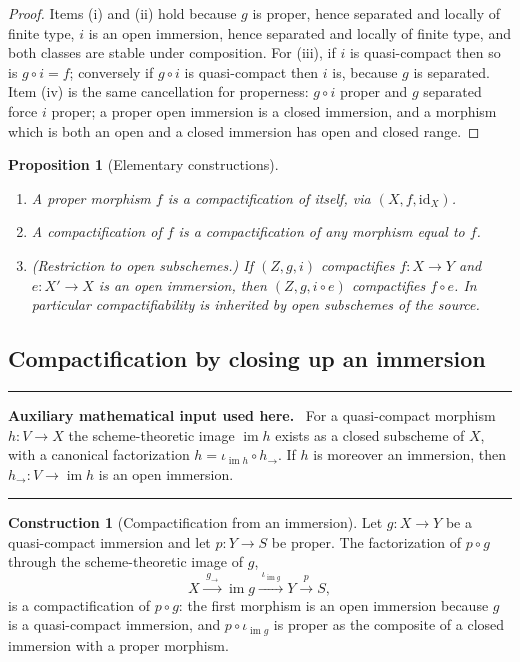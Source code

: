 \documentclass[11pt,a4paper]{article}
\theoremstyle{plain}
\newtheorem{proposition}[theorem]{Proposition}
\theoremstyle{definition}
\newtheorem{construction}[theorem]{Construction}
\theoremstyle{remark}
\newenvironment{auxinput}{%
  \par\medskip\begingroup\interlinepenalty=10000\relax
  \noindent\textcolor{orange!70!black}{\rule{\linewidth}{0.9pt}}%
  \par\nopagebreak\smallskip\noindent
  \textbf{Auxiliary mathematical input used here.}\ \ignorespaces}%
  {\par\nopagebreak\smallskip\nopagebreak\noindent
   \textcolor{orange!70!black}{\rule{\linewidth}{0.9pt}}\par\endgroup\medskip}
\newcommand{\im}{\operatorname{im}}
\begin{document}
\begin{proof}
Items (i) and (ii) hold because $g$ is proper, hence separated and locally of
finite type, $i$ is an open immersion, hence separated and locally of finite
type, and both classes are stable under composition. For (iii), if $i$ is
quasi-compact then so is $g\circ i=f$; conversely if $g\circ i$ is
quasi-compact then $i$ is, because $g$ is separated. Item (iv) is the same
cancellation for properness: $g\circ i$ proper and $g$ separated force $i$
proper; a proper open immersion is a closed immersion, and a morphism which is
both an open and a closed immersion has open and closed range.
\end{proof}

\begin{proposition}[Elementary constructions]
\label{prop:compactification-elementary}
\begin{enumerate}[label=\textup{(\roman*)}, itemsep=1pt]
\item A proper morphism $f$ is a compactification of itself, via $(X,f,\mathrm{id}_X)$.
\item A compactification of $f$ is a compactification of any morphism equal to $f$.
\item \emph{(Restriction to open subschemes.)} If $(Z,g,i)$ compactifies
      $f\colon X\to Y$ and $e\colon X'\to X$ is an open immersion, then
      $(Z,g,i\circ e)$ compactifies $f\circ e$. In particular
      compactifiability is inherited by open subschemes of the source.
\end{enumerate}
\end{proposition}

\subsection{Compactification by closing up an immersion}

\begin{auxinput}
For a quasi-compact morphism $h\colon V\to X$ the scheme-theoretic image
$\im h$ exists as a closed subscheme of $X$, with a canonical factorization
$h=\iota_{\im h}\circ h_{\to}$. If $h$ is moreover an immersion, then
$h_{\to}\colon V\to\im h$ is an open immersion.
\end{auxinput}

\begin{construction}[Compactification from an immersion]
\label{def:of-immersion}
Let $g\colon X\to Y$ be a quasi-compact immersion and let $p\colon Y\to S$ be
proper. The factorization of $p\circ g$ through the scheme-theoretic image of
$g$,
\[
  X \xrightarrow{\;g_{\to}\;} \im g \xrightarrow{\;\iota_{\im g}\;} Y
    \xrightarrow{\;p\;} S ,
\]
is a compactification of $p\circ g$: the first morphism is an open immersion
because $g$ is a quasi-compact immersion, and $p\circ\iota_{\im g}$ is proper
as the composite of a closed immersion with a proper morphism.
\end{construction}
\end{document}
